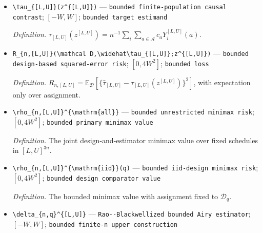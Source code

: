 \documentclass{article}
\begin{document}
\begin{itemize}
  \par\smallskip\noindent\emph{Definition.} \texttt{An arbitrary measurable decision rule clipped to the bounded causal target range.}
  \item \texttt{\textbackslash{}\allowbreak{}tau\_\allowbreak{}\{[L,\allowbreak{}U]\}\allowbreak{}(z\textasciicircum{}\{[L,\allowbreak{}U]\}\allowbreak{})} --- \texttt{bounded finite-\allowbreak{}population causal contrast}; \([-W,W]\); \texttt{bounded target estimand}
  \par\smallskip\noindent\emph{Definition.} \(\tau_{[L,U]}(z^{[L,U]})=n^{-1}\sum_i\sum_{a\in\mathcal A}c_aY_i^{[L,U]}(a)\).
  \item \texttt{R\_\allowbreak{}\{n,\allowbreak{}[L,\allowbreak{}U]\}\allowbreak{}(\textbackslash{}\allowbreak{}mathcal D,\allowbreak{}\textbackslash{}\allowbreak{}widehat\textbackslash{}\allowbreak{}tau\_\allowbreak{}\{[L,\allowbreak{}U]\}\allowbreak{};\allowbreak{}z\textasciicircum{}\{[L,\allowbreak{}U]\}\allowbreak{})} --- \texttt{bounded design-\allowbreak{}based squared-\allowbreak{}error risk}; \([0,4W^2]\); \texttt{bounded loss}
  \par\smallskip\noindent\emph{Definition.} \(R_{n,[L,U]}=\mathbb E_{\mathcal D}[\{\widehat\tau_{[L,U]}-\tau_{[L,U]}(z^{[L,U]})\}^2]\), with expectation only over assignment.
  \item \texttt{\textbackslash{}\allowbreak{}rho\_\allowbreak{}\{n,\allowbreak{}[L,\allowbreak{}U]\}\allowbreak{}\textasciicircum{}\{\textbackslash{}\allowbreak{}mathrm\{all\}\allowbreak{}\}\allowbreak{}} --- \texttt{bounded unrestricted minimax risk}; \([0,4W^2]\); \texttt{bounded primary minimax value}
  \par\smallskip\noindent\emph{Definition.} The joint design-and-estimator minimax value over fixed schedules in \([L,U]^{3n}\).
  \item \texttt{\textbackslash{}\allowbreak{}rho\_\allowbreak{}\{n,\allowbreak{}[L,\allowbreak{}U]\}\allowbreak{}\textasciicircum{}\{\textbackslash{}\allowbreak{}mathrm\{iid\}\allowbreak{}\}\allowbreak{}(q)} --- \texttt{bounded iid-\allowbreak{}design minimax risk}; \([0,4W^2]\); \texttt{bounded design comparator value}
  \par\smallskip\noindent\emph{Definition.} The bounded minimax value with assignment fixed to \(\mathcal D_q\).
  \item \texttt{\textbackslash{}\allowbreak{}delta\_\allowbreak{}\{n,\allowbreak{}q\}\allowbreak{}\textasciicircum{}\{[L,\allowbreak{}U]\}\allowbreak{}} --- \texttt{Rao-\allowbreak{}-\allowbreak{}Blackwellized bounded Airy estimator}; \([-W,W]\); \texttt{bounded finite-\allowbreak{}n upper construction}

\end{itemize}
\end{document}
